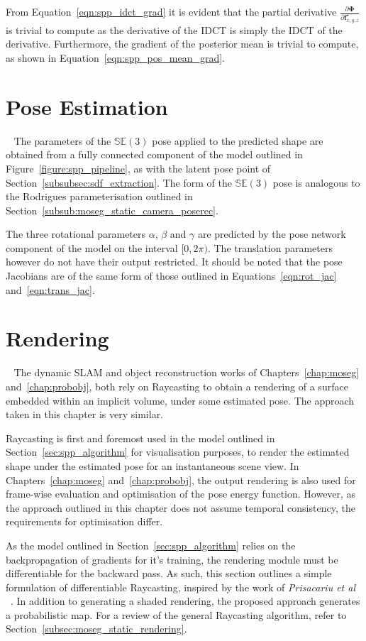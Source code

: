 From Equation~\ref{eqn:spp_idct_grad} it is evident that the partial derivative 
\( \frac{\partial \bm{\Phi}}{\partial \bm{f}_{x, y, z}^{\star}} \) is trivial 
to compute as the derivative of the IDCT is simply the IDCT of the derivative. 
Furthermore, the gradient of the posterior mean is trivial to compute, as shown 
in Equation~\ref{eqn:spp_pos_mean_grad}.

\section{Pose Estimation}
~\label{sec:spp_pose_estim}
The parameters of the \( \mathbb{SE}(3) \) pose applied to the predicted shape are obtained 
from a fully connected component of the model outlined in Figure~\ref{figure:spp_pipeline}, as with the 
latent pose point of Section~\ref{subsubsec:sdf_extraction}. The form of the \( \mathbb{SE}(3) \) pose is 
analogous to the Rodrigues parameterisation outlined in Section~\ref{subsub:moseg_static_camera_poserec}.

The three rotational parameters \( \alpha \), \( \beta \) and \( \gamma \) are predicted by 
the pose network component of the model on the interval \( [0, 2\pi) \). The translation parameters 
however do not have their output restricted. It should be noted that the pose Jacobians are of the 
same form of those outlined in Equations~\ref{eqn:rot_jac} and~\ref{eqn:trans_jac}.

\section{Rendering}
~\label{sec:spp_rendering}
The dynamic SLAM and object reconstruction works of Chapters~\ref{chap:moseg} and~\ref{chap:probobj}, 
both rely on Raycasting to obtain a rendering of a surface embedded within an implicit volume, under 
some estimated pose. The approach taken in this chapter is very similar. 

Raycasting is first and foremost used in the model outlined in Section~\ref{sec:spp_algorithm} for 
visualisation purposes, to render the estimated shape under the estimated pose for an instantaneous scene 
view. In Chapters~\ref{chap:moseg} and~\ref{chap:probobj}, the output rendering is also used for frame-wise 
evaluation and optimisation of the pose energy function. However, as the approach outlined in this chapter 
does not assume temporal consistency, the requirements for optimisation differ.

As the model outlined in Section~\ref{sec:spp_algorithm} relies on the backpropagation of gradients for it's 
training, the rendering module must be differentiable for the backward pass. As such, this section outlines a 
simple formulation of differentiable Raycasting, inspired by the work of \textit{Prisacariu et al}
~\cite{Prisacariu2011}. In addition to generating a shaded rendering, the proposed approach generates a 
probabilistic map. For a review of the general Raycasting algorithm, refer to 
Section~\ref{subsec:moseg_static_rendering}.


